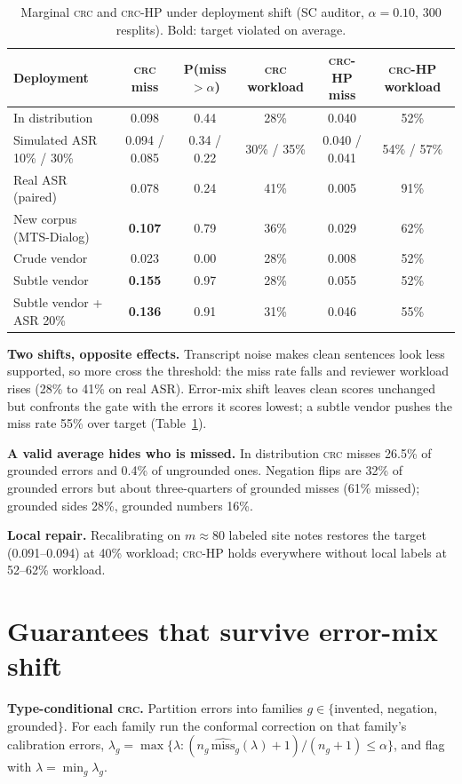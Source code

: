 \documentclass[10pt,twocolumn]{article}
\newcommand{\crc}{\textsc{crc}}
\begin{document}
\begin{table}[t]
\centering\small
\caption{Marginal \crc{} and \crc-HP under deployment shift (SC auditor, $\alpha=0.10$, 300 resplits). Bold: target violated on average.}\label{tab:shift}
\begin{tabular}{@{}lccccc@{}}
\toprule
Deployment & \crc{} miss & P(miss$>\alpha$) & \crc{} workload & \crc-HP miss & \crc-HP workload\\
\midrule
In distribution & 0.098 & 0.44 & 28\% & 0.040 & 52\%\\
Simulated ASR 10\% / 30\% & 0.094 / 0.085 & 0.34 / 0.22 & 30\% / 35\% & 0.040 / 0.041 & 54\% / 57\%\\
Real ASR (paired) & 0.078 & 0.24 & 41\% & 0.005 & 91\%\\
New corpus (MTS-Dialog) & \textbf{0.107} & 0.79 & 36\% & 0.029 & 62\%\\
Crude vendor & 0.023 & 0.00 & 28\% & 0.008 & 52\%\\
Subtle vendor & \textbf{0.155} & 0.97 & 28\% & 0.055 & 52\%\\
Subtle vendor + ASR 20\% & \textbf{0.136} & 0.91 & 31\% & 0.046 & 55\%\\
\bottomrule
\end{tabular}
\end{table}

\textbf{Two shifts, opposite effects.} Transcript noise makes clean sentences look less supported, so more cross the threshold: the miss rate falls and reviewer workload rises (28\% to 41\% on real ASR). Error-mix shift leaves clean scores unchanged but confronts the gate with the errors it scores lowest; a subtle vendor pushes the miss rate 55\% over target (Table~\ref{tab:shift}).

\textbf{A valid average hides who is missed.} In distribution \crc{} misses 26.5\% of grounded errors and 0.4\% of ungrounded ones. Negation flips are 32\% of grounded errors but about three-quarters of grounded misses (61\% missed); grounded sides 28\%, grounded numbers 16\%.

\textbf{Local repair.} Recalibrating on $m\approx80$ labeled site notes restores the target (0.091--0.094) at 40\% workload; \crc-HP holds everywhere without local labels at 52--62\% workload.

\section{Guarantees that survive error-mix shift}\label{sec:robust}
\textbf{Type-conditional \crc.} Partition errors into families $g\in\{$invented, negation, grounded$\}$. For each family run the conformal correction on that family's calibration errors, $\lambda_g=\max\{\lambda:(n_g\,\widehat{\mathrm{miss}}_g(\lambda)+1)/(n_g+1)\le\alpha\}$, and flag with $\lambda=\min_g\lambda_g$.
\end{document}
